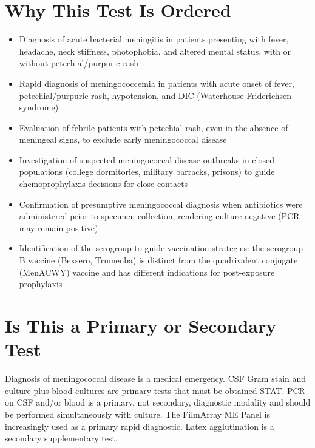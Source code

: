 \section*{Why This Test Is Ordered}
\begin{itemize}
  \item Diagnosis of acute bacterial meningitis in patients presenting with fever, headache, neck stiffness, photophobia, and altered mental status, with or without petechial/purpuric rash
  \item Rapid diagnosis of meningococcemia in patients with acute onset of fever, petechial/purpuric rash, hypotension, and DIC (Waterhouse-Friderichsen syndrome)
  \item Evaluation of febrile patients with petechial rash, even in the absence of meningeal signs, to exclude early meningococcal disease
  \item Investigation of suspected meningococcal disease outbreaks in closed populations (college dormitories, military barracks, prisons) to guide chemoprophylaxis decisions for close contacts
  \item Confirmation of presumptive meningococcal diagnosis when antibiotics were administered prior to specimen collection, rendering culture negative (PCR may remain positive)
  \item Identification of the serogroup to guide vaccination strategies: the serogroup B vaccine (Bexsero, Trumenba) is distinct from the quadrivalent conjugate (MenACWY) vaccine and has different indications for post-exposure prophylaxis
\end{itemize}

\section*{Is This a Primary or Secondary Test}
Diagnosis of meningococcal disease is a medical emergency. CSF Gram stain and culture plus blood cultures are primary tests that must be obtained STAT. PCR on CSF and/or blood is a primary, not secondary, diagnostic modality and should be performed simultaneously with culture. The FilmArray ME Panel is increasingly used as a primary rapid diagnostic. Latex agglutination is a secondary supplementary test.

